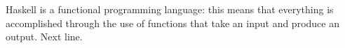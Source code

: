 \documentclass{article}
\begin{document}
    Haskell is a functional programming language: this means that everything is accomplished through the use of functions that take an input and produce an output.
    Next line.
\end{document}
